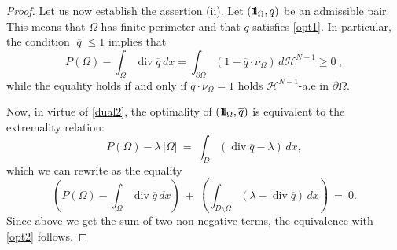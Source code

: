 \documentclass[reqno,11pt]{amsart}
\theoremstyle{definition}
\numberwithin{equation}{section}
\def\ov{\overline}
\DeclareMathOperator{\Div}{div}
\newcommand{\HH}{\mathcal{H}}
\newcommand{\1}{{{\bf 1}\kern-0,28em\rm l}}
\newcommand{\one}{{{\bf 1}\kern-0,28em\rm l}}
\def\O{\Omega}
\def\l{\lambda}
\begin{document}
\begin{proof}
\medskip
Let us now establish the assertion (ii). Let  $(\one_\O, q)$ be an admissible pair. This means that $\O$ has finite perimeter and that $q$ satisfies \eqref{opt1}.
In particular, the condition $|\ov q| \le 1$ implies that 
$$ P(\O) - \int_\O \Div \ov q\, dx=  \int_{\partial \O} (1- \ov q\cdot \nu_\O)\, d\HH^{N-1}  \ge 0 \ ,$$
while the equality holds if and only if  $\ov q\cdot \nu_\O =1$ holds $\HH^{N-1}$-a.e in $\partial \O$. 

Now, in virtue of \eqref{dual2}, the optimality of $(\one_\O, \ov q)$ is equivalent to the extremality relation:  
$$   P(\O) - \l \, |\O| \ =\  \int_D (\Div \ov q - \l)\, dx ,$$
which we can rewrite as the equality
$$ \left (P(\O) - \int_\O \Div \ov q \, dx\right) \ + \ \left(\int_{D\setminus\O} (\l - \Div \ov q)\, dx\right) \ =\ 0  .  $$
Since above we get the sum of two non negative terms,  
the equivalence with \eqref{opt2} follows. 

\end{proof}
\end{document}
